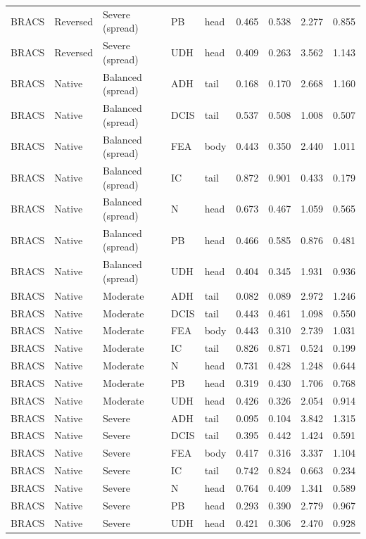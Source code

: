 \begin{longtable}{lllllrrrr}
BRACS & Reversed & Severe (spread) & PB & head & 0.465 & 0.538 & 2.277 & 0.855 \\
BRACS & Reversed & Severe (spread) & UDH & head & 0.409 & 0.263 & 3.562 & 1.143 \\
BRACS & Native & Balanced (spread) & ADH & tail & 0.168 & 0.170 & 2.668 & 1.160 \\
BRACS & Native & Balanced (spread) & DCIS & tail & 0.537 & 0.508 & 1.008 & 0.507 \\
BRACS & Native & Balanced (spread) & FEA & body & 0.443 & 0.350 & 2.440 & 1.011 \\
BRACS & Native & Balanced (spread) & IC & tail & 0.872 & 0.901 & 0.433 & 0.179 \\
BRACS & Native & Balanced (spread) & N & head & 0.673 & 0.467 & 1.059 & 0.565 \\
BRACS & Native & Balanced (spread) & PB & head & 0.466 & 0.585 & 0.876 & 0.481 \\
BRACS & Native & Balanced (spread) & UDH & head & 0.404 & 0.345 & 1.931 & 0.936 \\
BRACS & Native & Moderate & ADH & tail & 0.082 & 0.089 & 2.972 & 1.246 \\
BRACS & Native & Moderate & DCIS & tail & 0.443 & 0.461 & 1.098 & 0.550 \\
BRACS & Native & Moderate & FEA & body & 0.443 & 0.310 & 2.739 & 1.031 \\
BRACS & Native & Moderate & IC & tail & 0.826 & 0.871 & 0.524 & 0.199 \\
BRACS & Native & Moderate & N & head & 0.731 & 0.428 & 1.248 & 0.644 \\
BRACS & Native & Moderate & PB & head & 0.319 & 0.430 & 1.706 & 0.768 \\
BRACS & Native & Moderate & UDH & head & 0.426 & 0.326 & 2.054 & 0.914 \\
BRACS & Native & Severe & ADH & tail & 0.095 & 0.104 & 3.842 & 1.315 \\
BRACS & Native & Severe & DCIS & tail & 0.395 & 0.442 & 1.424 & 0.591 \\
BRACS & Native & Severe & FEA & body & 0.417 & 0.316 & 3.337 & 1.104 \\
BRACS & Native & Severe & IC & tail & 0.742 & 0.824 & 0.663 & 0.234 \\
BRACS & Native & Severe & N & head & 0.764 & 0.409 & 1.341 & 0.589 \\
BRACS & Native & Severe & PB & head & 0.293 & 0.390 & 2.779 & 0.967 \\
BRACS & Native & Severe & UDH & head & 0.421 & 0.306 & 2.470 & 0.928 \\

\end{longtable}
